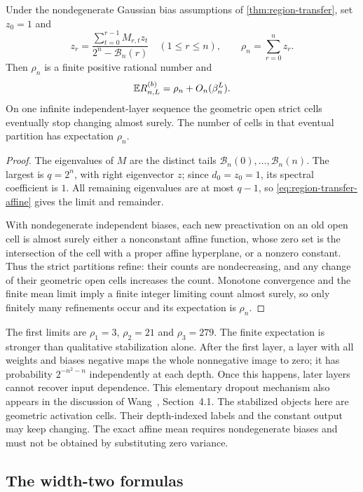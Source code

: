 \begin{corollary}\label{cor:affine-region-limit}
Under the nondegenerate Gaussian bias assumptions of \cref{thm:region-transfer}, set $z_0=1$ and
\[
z_r=\frac{\sum_{t=0}^{r-1}M_{r,t}z_t}{2^n-\mathcal B_n(r)}
\quad(1\le r\le n),\qquad
\rho_n=\sum_{r=0}^nz_r.
\]
Then $\rho_n$ is a finite positive rational number and
\[
\mathbb{E} R^{(b)}_{n,L}=\rho_n+O_n(\beta_n^L).
\]
On one infinite independent-layer sequence the geometric open strict cells eventually stop changing almost surely. The number of cells in that eventual partition has expectation $\rho_n$.
\end{corollary}

\begin{proof}
The eigenvalues of $M$ are the distinct tails $\mathcal B_n(0),\ldots,\mathcal B_n(n)$. The largest is $q=2^n$, with right eigenvector $z$; since $d_0=z_0=1$, its spectral coefficient is $1$. All remaining eigenvalues are at most $q-1$, so \cref{eq:region-transfer-affine} gives the limit and remainder.

With nondegenerate independent biases, each new preactivation on an old open cell is almost surely either a nonconstant affine function, whose zero set is the intersection of the cell with a proper affine hyperplane, or a nonzero constant. Thus the strict partitions refine: their counts are nondecreasing, and any change of their geometric open cells increases the count. Monotone convergence and the finite mean limit imply a finite integer limiting count almost surely, so only finitely many refinements occur and its expectation is $\rho_n$.
\end{proof}

The first limits are $\rho_1=3$, $\rho_2=21$ and $\rho_3=279$. The finite expectation is stronger than qualitative stabilization alone. After the first layer, a layer with all weights and biases negative maps the whole nonnegative image to zero; it has probability $2^{-n^2-n}$ independently at each depth. Once this happens, later layers cannot recover input dependence. This elementary dropout mechanism also appears in the discussion of Wang~\cite{wang2022}, Section~4.1. The stabilized objects here are geometric activation cells. Their depth-indexed labels and the constant output may keep changing. The exact affine mean requires nondegenerate biases and must not be obtained by substituting zero variance.

\subsection{The width-two formulas}

